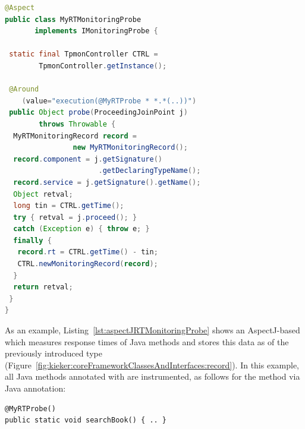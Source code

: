 \begin{lstlisting}[float, language=Java, caption=Example AspectJ response time Monitoring Probe, label=lst:aspectJRTMonitoringProbe]
@Aspect
public class MyRTMonitoringProbe
       implements IMonitoringProbe {

 static final TpmonController CTRL =
        TpmonController.getInstance();

 @Around
    (value="execution(@MyRTProbe * *.*(..))")
 public Object probe(ProceedingJoinPoint j)
        throws Throwable {
  MyRTMonitoringRecord record =
                new MyRTMonitoringRecord();
  record.component = j.getSignature()
                      .getDeclaringTypeName();
  record.service = j.getSignature().getName();
  Object retval;
  long tin = CTRL.getTime();
  try { retval = j.proceed(); }
  catch (Exception e) { throw e; }
  finally {
   record.rt = CTRL.getTime() - tin;
   CTRL.newMonitoringRecord(record);
  }
  return retval;
 }
}
\end{lstlisting}

As an example, Listing~\ref{lst:aspectJRTMonitoringProbe} shows an AspectJ-based \MonitoringProbe{} %
which measures response times of Java methods and stores this data as \MonitoringRecords{} %
of the previously introduced type  (Figure~\ref{fig:kieker:coreFrameworkClassesAndInterfaces:record}). %
In this example, all Java methods annotated with  %
are instrumented, as follows for the method  via Java annotation:\\

\begin{minipage}{\columnwidth}
{\small
\begin{verbatim}
@MyRTProbe()
public static void searchBook() { .. }
\end{verbatim}
}
\end{minipage}\\


